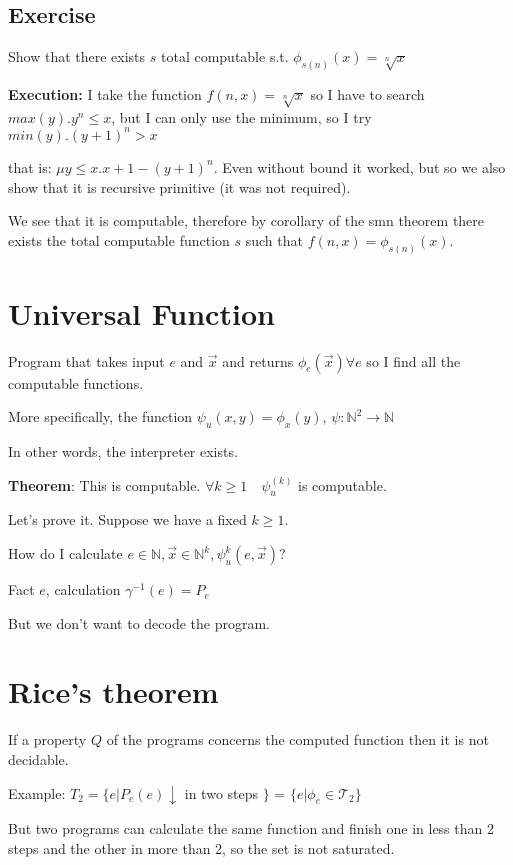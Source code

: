 \documentclass{amsbook}
\newcommand{\nat}{\ensuremath{\mathbb{N}}}
\theoremstyle{definition}
\theoremstyle{remark}
\numberwithin{section}{chapter}
\numberwithin{equation}{chapter}
\begin{document}
\section {Exercise}

Show that there exists $s$ total computable s.t. $ \phi_{s(n)}(x) = \sqrt[n]{x} $

\textbf{Execution:} I take the function $ f(n,x) = \sqrt[n]{x} $ so I have to search \\ $ max(y) . y^n \leq x $, but I can only use the minimum, so I try $ min(y). (y+1)^n > x $

that is: $ \mu y \leq x . x+1 - (y+1)^n $. Even without bound it worked, but so we also show that it is recursive primitive (it was not required).

We see that it is computable, therefore by corollary of the smn theorem there exists the total computable function $s$ such that $ f(n,x) = \phi_{s(n)}(x) $.

\chapter {Universal Function}
Program that takes input $ e $ and $ \vec{x} $ and returns $ \phi_e(\vec{x}) \forall e$ so I find all the computable functions.

More specifically, the function $ \psi_u(x,y) = \phi_x(y)$, $ \psi : \nat^2 \rightarrow \nat $

In other words, the interpreter exists.

\textbf{Theorem}: This is computable. $ \forall k \geq 1  \quad  \psi_u^{(k)} $ is computable.

Let's prove it. Suppose we have a fixed $ k \geq 1 $.

How do I calculate $ e \in \nat, \vec{x} \in \nat^k, \psi_u^{k}(e, \vec{x}) $?

Fact $e$, calculation $ \gamma^{-1}(e) = P_e $

But we don't want to decode the program.

\chapter {Rice's theorem}

If a property $Q$ of the programs concerns the computed function then it is not decidable.

Example: $ T_2 = \{ e | P_e(e)\downarrow $ in two steps $ \} $ = $ \{e|\phi_e \in \mathcal{T}_2 \} $

But two programs can calculate the same function and finish one in less than 2 steps and the other in more than 2, so the set is not saturated.
\end{document}
